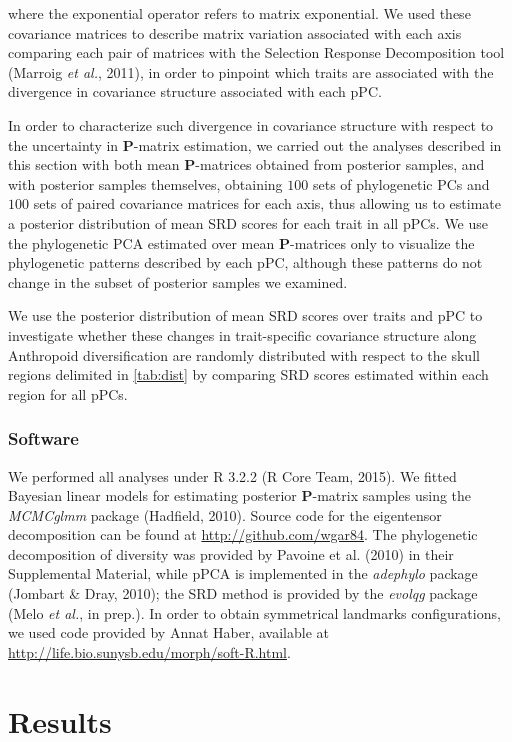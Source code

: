 \documentclass[12pt,twoside]{report}
\begin{document}
where the exponential operator refers to matrix exponential. We used
these covariance matrices to describe matrix variation associated with
each axis comparing each pair of matrices with the Selection Response
Decomposition tool (Marroig \emph{et al.}, 2011), in order to pinpoint
which traits are associated with the divergence in covariance structure
associated with each pPC.

In order to characterize such divergence in covariance structure with
respect to the uncertainty in $\mathbf{P}$-matrix estimation, we carried
out the analyses described in this section with both mean
$\mathbf{P}$-matrices obtained from posterior samples, and with
posterior samples themselves, obtaining $100$ sets of phylogenetic PCs
and $100$ sets of paired covariance matrices for each axis, thus
allowing us to estimate a posterior distribution of mean SRD scores for
each trait in all pPCs. We use the phylogenetic PCA estimated over mean
$\mathbf{P}$-matrices only to visualize the phylogenetic patterns
described by each pPC, although these patterns do not change in the
subset of posterior samples we examined.

We use the posterior distribution of mean SRD scores over traits and pPC
to investigate whether these changes in trait-specific covariance
structure along Anthropoid diversification are randomly distributed with
respect to the skull regions delimited in \autoref{tab:dist} by
comparing SRD scores estimated within each region for all pPCs.

\subsubsection{Software}\label{software-2}

We performed all analyses under R 3.2.2 (R Core Team, 2015). We fitted
Bayesian linear models for estimating posterior $\mathbf{P}$-matrix
samples using the \emph{MCMCglmm} package (Hadfield, 2010). Source code
for the eigentensor decomposition can be found at
\url{http://github.com/wgar84}. The phylogenetic decomposition of
diversity was provided by Pavoine et al. (2010) in their Supplemental
Material, while pPCA is implemented in the \emph{adephylo} package
(Jombart \& Dray, 2010); the SRD method is provided by the \emph{evolqg}
package (Melo \emph{et al.}, in prep.). In order to obtain symmetrical
landmarks configurations, we used code provided by Annat Haber,
available at \url{http://life.bio.sunysb.edu/morph/soft-R.html}.

\section{Results}\label{results-2}
\end{document}
